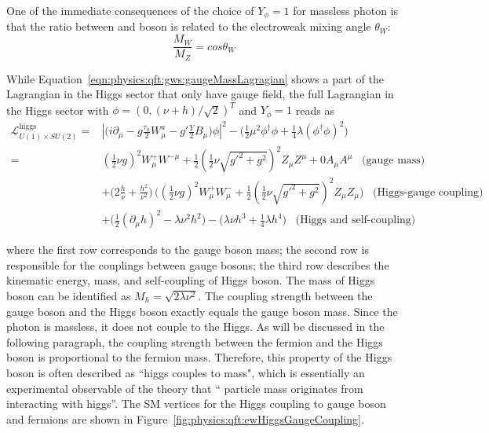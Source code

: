 \noindent One of the immediate consequences of the choice of $Y_{\phi}=1$ for massless photon is that the ratio between \PW and \PZ boson is related to the electroweak mixing angle $\theta_W$:
\begin{equation}
\frac{M_W}{M_Z} = cos\theta_W
\end{equation}

\noindent While Equation~\ref{eqn:physics:qft:gws:gaugeMassLagragian} shows a part of the Lagrangian in the Higgs sector that only have gauge field, the full Lagrangian in the Higgs sector with $\phi = (0, (\nu+h) /\sqrt{2} )^T $  and  $Y_{\phi} = 1$ reads as
\begin{equation}
\begin{split}
    \mathcal{L}_{U(1)\times SU(2)}^{\text{higgs}} 
    = & \left\lvert  \big( i \partial_\mu -g \frac{\tau_a}{2} W^a_\mu -g'\frac{Y}{2} B_\mu \big)\phi \right\rvert ^2 - \big(\frac{1}{2} \mu^2 \phi^\dagger\phi + \frac{1}{4} \lambda(\phi^\dagger\phi )^2 \big)\\
    = &  (\frac{1}{2}\nu g)^2 W^+_\mu W^{-\mu} +  \frac{1}{2} (\frac{1}{2}\nu \sqrt{g'^2+g^2})^2 Z_\mu Z^\mu + 0 A_\mu A^\mu  \;\;\; \text{(gauge mass)} \\
    & + \big( 2 \frac{h}{\nu} + \frac{h^2}{\nu^2} \big) \, \big( (\frac{1}{2}\nu g)^2 W^+_\mu W^-_\mu + \frac{1}{2} (\frac{1}{2}\nu \sqrt{g'^2+g^2})^2  Z_\mu Z_\mu \big) \;\;\; \text{(Higgs-gauge coupling)}\\
    & + \big(\frac{1}{2} (\partial_\mu h)^2 -\lambda\nu^2h^2\big)  - \big ( \lambda \nu h^3 + \frac{1}{4}\lambda h^4 \big) \;\;\; \text{(Higgs and self-coupling)}
\end{split}
\end{equation}

\noindent where the first row corresponds to the gauge boson mass; the second row is responsible for the couplings between gauge bosons; the third row describes the kinematic energy, mass, and self-coupling of Higgs boson. The mass of Higgs boson can be identified as $M_h=\sqrt{2\lambda \nu^2}$. The coupling strength between the gauge boson and the Higgs boson exactly equals the gauge boson mass. Since the photon is massless, it does not couple to the Higgs. As will be discussed in the following paragraph, the coupling strength between the fermion and the Higgs boson is proportional to the fermion mass. Therefore, this property of the Higgs boson is often described as ``higgs couples to mass", which is essentially an experimental observable of the theory that `` particle mass originates from interacting with higgs''. The SM vertices for the Higgs coupling to gauge boson and fermions are shown in Figure~\ref{fig:physics:qft:ewHiggsGaugeCoupling}.

